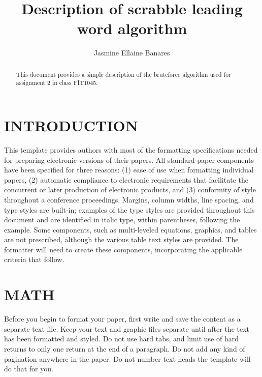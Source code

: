 \documentclass[letterpaper, 10 pt, conference]{IEEEconf}  %
\title{\LARGE \bf
        Description of scrabble leading word algorithm
        }
\author{Jasmine Ellaine Banares$^{}$%
        }
\begin{document}
        
        
        
        \maketitle
        \thispagestyle{empty}
        \pagestyle{empty}
        
        
        \begin{abstract}
        
        This document provides a simple description of the bruteforce algorithm used for assignment 2 in class FIT1045.
        
        \end{abstract}
        
        
        \section{INTRODUCTION}
        
        This template provides authors with most of the formatting specifications needed for preparing electronic versions of their papers. All standard paper components have been specified for three reasons: (1) ease of use when formatting individual papers, (2) automatic compliance to electronic requirements that facilitate the concurrent or later production of electronic products, and (3) conformity of style throughout a conference proceedings. Margins, column widths, line spacing, and type styles are built-in; examples of the type styles are provided throughout this document and are identified in italic type, within parentheses, following the example. Some components, such as multi-leveled equations, graphics, and tables are not prescribed, although the various table text styles are provided. The formatter will need to create these components, incorporating the applicable criteria that follow.
        
        
        \section{MATH}
        
        Before you begin to format your paper, first write and save the content as a separate text file. Keep your text and graphic files separate until after the text has been formatted and styled. Do not use hard tabs, and limit use of hard returns to only one return at the end of a paragraph. Do not add any kind of pagination anywhere in the paper. Do not number text heads-the template will do that for you.
        
\end{document}
